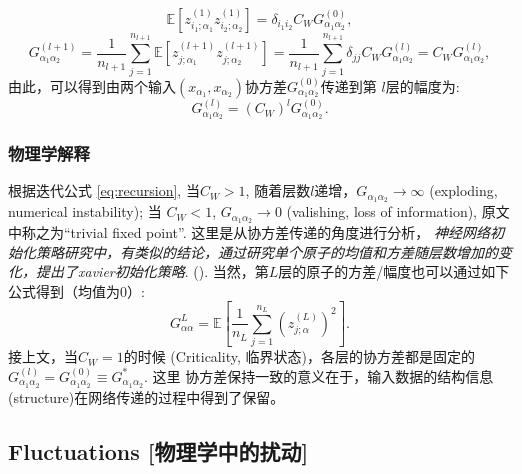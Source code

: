 \begin{equation}
    \mathbb{E}[z_{i_1;\alpha_1}^{(1)}z_{i_2;\alpha_2}^{(1)}] = \delta_{i_1i_2}C_W G_{\alpha_1\alpha_2}^{(0)},
\end{equation}
\begin{equation}
    G_{\alpha_1\alpha_2}^{(l+1)} = 
        \frac{1}{n_{l+1}} \sum_{j=1}^{n_{l+1}} \mathbb{E}[z_{j;\alpha_1}^{(l+1)}z_{j;\alpha_2}^{(l+1)}] 
        = \frac{1}{n_{l+1}}\sum_{j=1}^{n_{l+1}} \delta_{jj}C_W G_{\alpha_1\alpha_2}^{(l)}
        = C_W G_{\alpha_1\alpha_2}^{(l)},
\end{equation}
由此，可以得到由两个输入$(x_{\alpha_1}, x_{\alpha_2})$协方差$G_{\alpha_1\alpha_2}^{(0)}$传递到第
$l$层的幅度为:
\begin{equation}
    G_{\alpha_1\alpha_2}^{(l)} = (C_W)^l G_{\alpha_1\alpha_2}^{(0)}.
    \label{eq:recursion}
\end{equation} 

\subsubsection{物理学解释}
\label{sec:2point-ana}
根据迭代公式 \ref{eq:recursion}, 当$C_W > 1$, 随着层数$l$递增，$G_{\alpha_1\alpha_2} \to \infty$ (exploding,
numerical instability); 当 $C_W < 1$, $G_{\alpha_1\alpha_2} \to 0$ (valishing, loss of information), 
原文中称之为``trivial fixed point''. 这里是从协方差传递的角度进行分析， 
\emph{神经网络初始化策略研究中，有类似的结论，通过研究单个原子的均值和方差随层数增加的变化，提出了xavier初始化策略}.
(). 当然，第$L$层的原子的方差/幅度也可以通过如下公式得到（均值为$0$）:
\begin{equation*}
    G_{\alpha\alpha}^L = \mathbb{E} [\frac{1}{n_L} \sum_{j=1}^{n_L}(z_{j;\alpha}^{(L)})^2].
\end{equation*}
接上文，当$C_W=1$的时候 (Criticality, 临界状态)，各层的协方差都是固定的 
$G_{\alpha_1\alpha_2}^{(l)} = G_{\alpha_1\alpha_2}^{(0)} \equiv G_{\alpha_1\alpha_2}^*$. 这里
协方差保持一致的意义在于，输入数据的结构信息(structure)在网络传递的过程中得到了保留。

\subsection{Fluctuations [物理学中的扰动]}
\label{sec:3-3}
